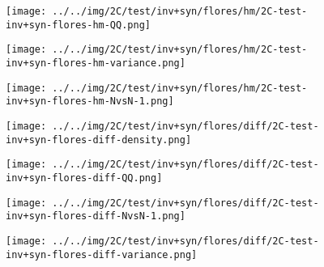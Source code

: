 \begin{figure}[H]
\centering	\texttt{[image: ../../img/2C/test/inv+syn/flores/hm/2C-test-inv+syn-flores-hm-QQ.png]}
\end{figure}
\begin{figure}[H]
\centering	\texttt{[image: ../../img/2C/test/inv+syn/flores/hm/2C-test-inv+syn-flores-hm-variance.png]}
\end{figure}
\begin{figure}[H]
\centering	\texttt{[image: ../../img/2C/test/inv+syn/flores/hm/2C-test-inv+syn-flores-hm-NvsN-1.png]}
\end{figure}
\begin{figure}[H]
\centering	\texttt{[image: ../../img/2C/test/inv+syn/flores/diff/2C-test-inv+syn-flores-diff-density.png]}
\end{figure}
\begin{figure}[H]
\centering	\texttt{[image: ../../img/2C/test/inv+syn/flores/diff/2C-test-inv+syn-flores-diff-QQ.png]}
\end{figure}
\begin{figure}[H]
\centering	\texttt{[image: ../../img/2C/test/inv+syn/flores/diff/2C-test-inv+syn-flores-diff-NvsN-1.png]}
\end{figure}
\begin{figure}[H]
\centering	\texttt{[image: ../../img/2C/test/inv+syn/flores/diff/2C-test-inv+syn-flores-diff-variance.png]}
\end{figure}
